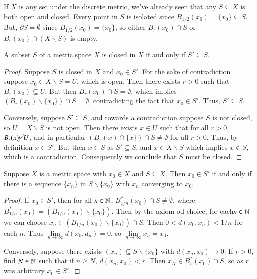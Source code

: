 \begin{eg}
    If $X$ is any set under the discrete metric, we've already seen that any $S \subseteq X$ is both open and closed. Every point in $S$ is isolated since $B_{1/2}(x_0) = \{x_0\} \subseteq S$. But, $\partial S = \emptyset$ since $B_{1/2}(x_0) = \{x_0\}$, so either $B_r(x_0)\cap S$ or $B_r(x_0) \cap (X\backslash S)$ is empty.
\end{eg}

\begin{prop}
    A subset $S$ of a metric space $X$ is closed in $X$ if and only if $S' \subseteq S$.
\end{prop}
\begin{proof}
    Suppose $S$ is closed in $X$ and $x_0 \in S'$. For the sake of contradiction suppose $x_0 \in X\backslash S = U$, which is open. Then there exists $r > 0$ such that $B_r(x_0) \subseteq U$. But then $B_r(x_0) \cap S = \emptyset$, which implies $(B_r(x_0)\backslash\{x_0\})\cap S = \emptyset$, contradicting the fact that $x_0 \in S'$. Thus, $S' \subseteq S$.

    Conversely, suppose $S' \subseteq S$, and towards a contradiction suppose $S$ is not closed, so $U = X\backslash S$ is not open. Then there exists $x \in U$ such that for all $r > 0$, $B_r(x) \cancel{\subseteq} U$, and in particular $(B_r(x)\cap \{x\})\cap S \neq \emptyset$ for all $r > 0$. Thus, by definition $x \in S'$. But then $x \in S$ as $S' \subseteq S$, and $x \in X\backslash S$ which implies $x \notin S$, which is a contradiction. Consequently we conclude that $S$ must be closed.
\end{proof}

\begin{prop}
    Suppose $X$ is a metric space with $x_0 \in X$ and $S \subseteq X$. Then $x_0 \in S'$ if and only if there is a sequence $\{x_n\}$ in $S\backslash\{x_0\}$ with $x_n$ converging to $x_0$.
\end{prop}
\begin{proof}
    If $x_0 \in S'$, then for all $n \in \mathbb N$, $B^*_{1/n}(x_0) \cap S\neq \emptyset$, where $B^*_{1/n}(x_0) = (B_{1/n}(x_0)\backslash \{x_0\})$. Then by the axiom od choice, for each$ n \in \mathbb N$ we can choose $x_n \in (B_{1/n}(x_0)\backslash\{x_0\})\cap S$. Then $0 < d(x_0,x_n) < 1/n$ for each $n$. Thus $\lim\limits_{n\rightarrow \infty}d(x_0,d_n) = 0$, so $\lim\limits_{n\rightarrow \infty}x_n = x_0$.

    Conversely, suppose there exists $(x_n) \subseteq S\backslash\{x_0\}$ with $d(x_n,x_0)\rightarrow 0$. If $r > 0$, find $N \in \mathbb N$ such that if $n \geq N$, $d(x_n,x_0) < r$. Then $x_N \in B_r^*(x_0)\cap S$, so as $r$ was arbitrary $x_0 \in S'$.
\end{proof}

